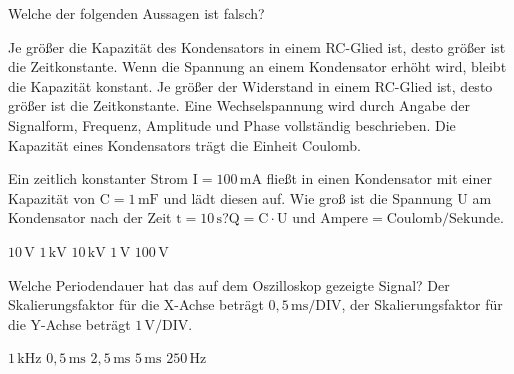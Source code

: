 \documentclass[11pt]{exam}
\begin{document}
\setlength{\voffset}{-0.5in}
\setlength{\headsep}{5pt}

\hspace{2mm}
 \hspace{5mm}
\vspace{4mm}

\begin{questions}

\question Welche der folgenden Aussagen ist falsch?

\begin{choices}
	\choice Je größer die Kapazität des Kondensators in einem RC-Glied ist, desto größer ist die Zeitkonstante.
	\choice Wenn die Spannung an einem Kondensator erhöht wird, bleibt die Kapazität konstant.
	\choice Je größer der Widerstand in einem RC-Glied ist, desto größer ist die Zeitkonstante.
	\choice Eine Wechselspannung wird durch Angabe der Signalform, Frequenz, Amplitude und Phase vollständig beschrieben.
	\choice Die Kapazität eines Kondensators trägt die Einheit Coulomb.
\end{choices}

\vspace{3mm}\question Ein zeitlich konstanter Strom \(\mathrm{I=100\,mA}\) fließt in einen Kondensator mit einer Kapazität von \(\mathrm{C=1\,mF}\) und lädt diesen auf. Wie groß ist die Spannung \(\mathrm{U}\) am Kondensator nach der Zeit \(\mathrm{t=10\,s}\)?\(\mathrm{Q=C \cdot U}\) und \(\mathrm{Ampere=Coulomb/Sekunde}\).

\begin{choices}
	\choice \(\mathrm{10\,V}\)
	\choice \(\mathrm{1\,kV}\)
	\choice \(\mathrm{10\,kV}\)
	\choice \(\mathrm{1\,V}\)
	\choice \(\mathrm{100\,V}\)
\end{choices}

\vspace{3mm}\question Welche Periodendauer hat das auf dem Oszilloskop gezeigte Signal? Der Skalierungsfaktor für die X-Achse beträgt \(\mathrm{0,5\,ms/DIV}\), der Skalierungsfaktor für die Y-Achse beträgt \(\mathrm{1\,V/DIV}\).

\begin{choices}
	\choice \(\mathrm{1\,kHz}\)
	\choice \(\mathrm{0,5\,ms}\)
	\choice \(\mathrm{2,5\,ms}\)
	\choice \(\mathrm{5\,ms}\)
	\choice \(\mathrm{250\,Hz}\)
\end{choices}


\end{questions}
\end{document}
